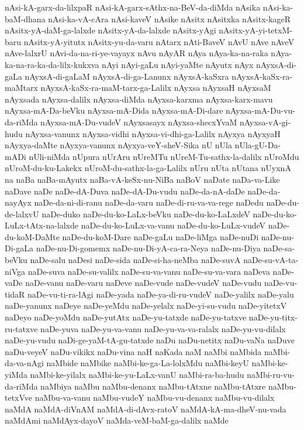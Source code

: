 {nAsi-kA-garx-da-lilxpaR
nAsi-kA-garx-sAthx-na-BeV-da-diMda
nAsika
nAsi-ka-baM-dhana
nAsi-ka-vA-cAra
nAsi-kaveV
nAsike
nAsitx
nAsitxka
nAsitx-kageR
nAsitx-yA-daM-ga-lalxde
nAsitx-yA-da-lalxde
nAsitx-yAgi
nAsitx-yA-yi-tetxM-baru
nAsitx-yA-yitutx
nAsitx-yu-da-varu
nAtarx
nAti-BaveV
nAvU
nAve
nAveV
nAve-lalxrU
nAvi-da-na-ri-ye-vayayx
nAvu
nAyAR
nAya
nAya-ka-na-raka
nAya-ka-na-ra-ka-da-lilx-kukxva
nAyi
nAyi-gaLu
nAyi-yaMte
nAyutx
nAyx
nAyxsA-di-gaLa
nAyxsA-di-gaLaM
nAyxsA-di-ga-Lanunx
nAyxsA-kaSxra
nAyxsA-kaSx-ra-maMtarx
nAyxsA-kaSx-ra-maM-tarx-ga-Lalilx
nAyxsa
nAyxsaH
nAyxsaM
nAyxsada
nAyxsa-dalilx
nAyxsa-diMda
nAyxsa-karxma
nAyxsa-karx-mavu
nAyxsa-mA-Da-beVku
nAyxsa-mA-Dida
nAyxsa-mA-Di-dare
nAyxsa-mA-Du-vu-da-riMda
nAyxsa-mA-Du-vudeV
nAyxsasayx
nAyxsa-shecxYvaM
nAyxsa-vA-gi-hudu
nAyxsa-vanunx
nAyxsa-vidhi
nAyxsa-vi-dhi-ga-Lalilx
nAyxya
nAyxyaH
nAyxya-daMte
nAyxya-vanunx
nAyxya-veY-sheV-Sika
nU
nUla
nUla-gU-Da-mADi
nUli-niMda
nUpura
nUrAru
nUreMTu
nUreM-Tu-sathx-la-dalilx
nUroMdu
nUroM-du-ku-Lakekx
nUroM-du-sathx-la-ga-Lalilx
nUru
nUta
nUtana
nUyxnA
na
naBa
naBa-mAyutx
naBa-vA-keSx-nu-NiBa
naBoV
naDate
naDa-va-Like
naDave
naDe
naDe-dA-Duva
naDe-dA-Du-vudu
naDe-da-nA-daDe
naDe-da-nayAyx
naDe-da-ni-di-ranu
naDe-da-varu
naDe-di-ru-va-va-rege
naDedu
naDe-du-de-lalxvU
naDe-duko
naDe-du-ko-LaLx-beVku
naDe-du-ko-LaLxdeV
naDe-du-ko-LuLx-tAtx-na-lalxde
naDe-du-ko-LuLx-va-vanu
naDe-du-ko-LuLx-vudeV
naDe-du-koM-DaMte
naDe-du-koM-Dare
naDe-gaLu
naDe-liMga
naDe-nuDi
naDe-nu-Di-gaLa
naDe-nu-Di-gomemx
naDe-nu-Di-yA-ca-ra-Neya
naDe-nu-Diya
naDe-sa-beVku
naDe-salu
naDesi
naDe-sida
naDe-si-ha-neMba
naDe-suvA
naDe-su-vA-ta-niVga
naDe-suva
naDe-su-valilx
naDe-su-va-vanu
naDe-su-va-vara
naDeva
naDe-vaDe
naDe-vanu
naDe-varu
naDeve
naDe-vude
naDe-vudeV
naDe-vudu
naDe-vu-tidaR
naDe-vu-ti-ra-lAgi
naDe-yada
naDe-ya-di-ru-vudeV
naDe-yalilx
naDe-yalu
naDe-yanunx
naDeye
naDe-yeMdu
naDe-yelalx
naDe-yi-su-vudu
naDe-yitetxV
naDeyo
naDe-yoMdu
naDe-yutAtx
naDe-yu-tatxde
naDe-yu-tatxve
naDe-yu-titx-ru-tatxve
naDe-yuva
naDe-yu-va-vanu
naDe-yu-va-va-ralalx
naDe-yu-vu-dilalx
naDe-yu-vudu
naDi-ge-yaM-tA-gu-tatxde
naDu
naDu-netitx
naDu-vaNa
naDuve
naDu-veyeV
naDu-vikikx
naDu-vina
naH
naKada
naM
naMbi
naMbida
naMbi-da-va-nAgi
naMbide
naMbike
naMbi-ke-ga-La-lolxMdu
naMbi-keyU
naMbi-ke-yiMda
naMbi-ke-yilalx
naMbi-ke-yu-LaLx-vanU
naMbi-ra-ba-hudu
naMbi-ru-vu-da-riMda
naMbiya
naMbu
naMbu-denanx
naMbu-tAtxne
naMbu-tAtxre
naMbu-tetxVve
naMbu-va-vanu
naMbu-vudeY
naMbu-vu-denanx
naMbu-vu-dilalx
naMdA
naMdA-diVnAM
naMdA-di-dAvx-ratoV
naMdA-kA-ma-dheV-nu-vada
naMdAmi
naMdAyx-dayoV
naMda-veM-baM-ga-dalilx
naMde
}
